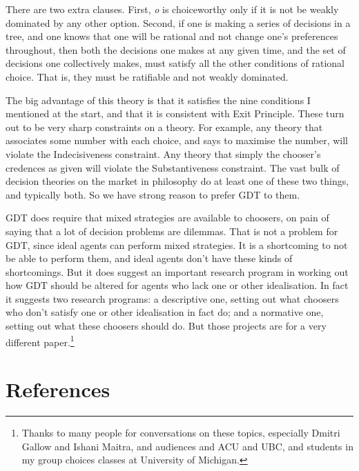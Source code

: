 \documentclass[
  12pt,
  letterpaper,
  DIV=11,
  numbers=noendperiod]{scrreprt}
\begin{document}
There are two extra clauses. First, \emph{o} is choiceworthy only if it
is not be weakly dominated by any other option. Second, if one is making
a series of decisions in a tree, and one knows that one will be rational
and not change one's preferences throughout, then both the decisions one
makes at any given time, and the set of decisions one collectively
makes, must satisfy all the other conditions of rational choice. That
is, they must be ratifiable and not weakly dominated.

The big advantage of this theory is that it satisfies the nine
conditions I mentioned at the start, and that it is consistent with Exit
Principle. These turn out to be very sharp constraints on a theory. For
example, any theory that associates some number with each choice, and
says to maximise the number, will violate the Indecisiveness constraint.
Any theory that simply the chooser's credences as given will violate the
Substantiveness constraint. The vast bulk of decision theories on the
market in philosophy do at least one of these two things, and typically
both. So we have strong reason to prefer GDT to them.

GDT does require that mixed strategies are available to choosers, on
pain of saying that a lot of decision problems are dilemmas. That is not
a problem for GDT, since ideal agents can perform mixed strategies. It
is a shortcoming to not be able to perform them, and ideal agents don't
have these kinds of shortcomings. But it does suggest an important
research program in working out how GDT should be altered for agents who
lack one or other idealisation. In fact it suggests two research
programs: a descriptive one, setting out what choosers who don't satisfy
one or other idealisation in fact do; and a normative one, setting out
what these choosers should do. But those projects are for a very
different paper.\footnote{Thanks to many people for conversations on
  these topics, especially Dmitri Gallow and Ishani Maitra, and
  audiences and ACU and UBC, and students in my group choices classes at
  University of Michigan.}


\hypertarget{references}{%
\chapter*{References}\label{references}}

\end{document}
